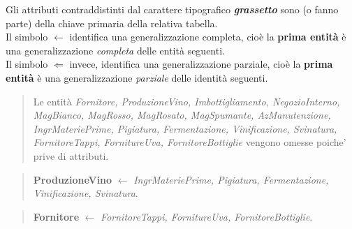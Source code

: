 Gli attributi contraddistinti dal carattere tipografico \textbf{\emph{grassetto}} sono (o fanno parte) della chiave primaria della relativa tabella. \\
Il simbolo $\gets$ identifica una generalizzazione completa, cioè la \textbf{prima entità} è una generalizzazione \emph{completa} delle entità seguenti.\\
Il simbolo $\Leftarrow$ invece, identifica una generalizzazione parziale, cioè la \textbf{prima entità} è una generalizzazione \emph{parziale} delle identità seguenti.

\begin{verse}
	Le entità \emph{Fornitore, ProduzioneVino, Imbottigliamento, NegozioInterno, MagBianco, MagRosso, MagRosato, MagSpumante, AzManutenzione, IngrMateriePrime, Pigiatura, Fermentazione, Vinificazione, Svinatura, FornitoreTappi, FornitureUva, FornitoreBottiglie} vengono omesse poiche' prive di attributi.
\end{verse}
\begin{verse}
	\textbf{ProduzioneVino} $\gets$ \emph{IngrMateriePrime, Pigiatura, Fermentazione, Vinificazione, Svinatura}.
\end{verse}
\begin{verse}
	\textbf{Fornitore} $\gets$ \emph{FornitoreTappi, FornitureUva, FornitoreBottiglie}.
\end{verse}

